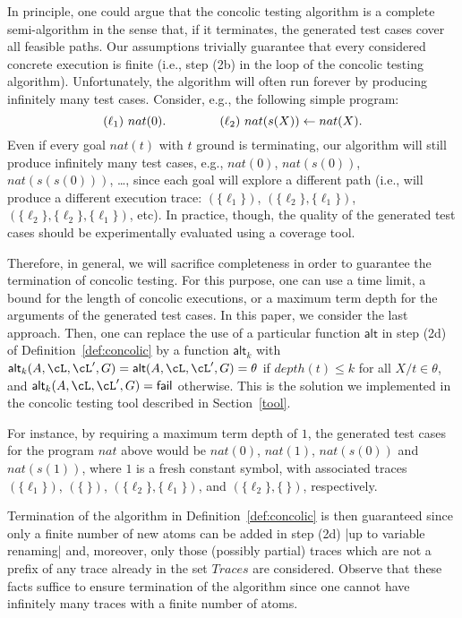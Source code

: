 \documentclass[fleqn]{tlp}
\newcommand{\alt}{\mathsf{alt}}
\newcommand{\sleq}{\leqslant}
\newcommand{\fail}{\mathsf{fail}}
\begin{document}
In principle, one could argue that the concolic testing algorithm is
a complete semi-algorithm in the sense that, if it terminates, the
generated test cases cover all feasible paths. Our assumptions
trivially guarantee that every considered concrete execution is finite
(i.e., step (2b) in the loop of the concolic testing
algorithm). Unfortunately, the algorithm will often run forever by
producing infinitely many test cases. Consider, e.g., the following
simple program:
\[
(\ell_1) ~nat(0).\hspace{10ex} (\ell_2)~nat(s(X)) \leftarrow nat(X).
\]
Even if every goal $nat(t)$ with $t$ ground is terminating, our
algorithm will still produce infinitely many test cases, e.g.,
$nat(0)$, $nat(s(0))$, $nat(s(s(0)))$, \ldots, since each goal will
explore a different path (i.e., will produce a different execution
trace: $(\{\ell_1\})$, $(\{\ell_2\},\{\ell_1\})$,
$(\{\ell_2\},\{\ell_2\},\{\ell_1\})$, etc). In practice, though, the
quality of the generated test cases should be experimentally evaluated
using a coverage tool.

Therefore, in general, we will sacrifice completeness in order to
guarantee the termination of concolic testing. For this purpose, one
can use a time limit, a bound for the length of concolic executions,
or a maximum term depth for the arguments of the generated test
cases. In this paper, we consider the last approach.
Then, one can replace the use of a particular function $\alt$ in step
(2d) of Definition~\ref{def:concolic} by a function $\alt_k$ with
$\alt_k(A,\cL,\cL',G)=\alt(A,\cL,\cL',G)=\theta$ if $depth(t)\sleq k$
for all $X/t\in\theta$, and $\alt_k(A,\cL,\cL',G) =\fail$ otherwise.
This is the solution we implemented in the concolic testing tool
described in Section~\ref{tool}.

For instance, by requiring a maximum term depth of $1$, the
generated test cases for the program $nat$ above would be $nat(0)$,
$nat(1)$, $nat(s(0))$ and $nat(s(1))$, where $1$ is a fresh constant
symbol, with associated traces $(\{\ell_1\})$, $(\{\:\})$,
$(\{\ell_2\},\{\ell_1\})$, and $(\{\ell_2\},\{\:\})$, respectively.

Termination of the algorithm in Definition~\ref{def:concolic} is then
guaranteed since only a finite number of new atoms can be added in
step (2d) |up to variable renaming| and, moreover, only those (possibly
partial) traces which are not a prefix of any trace already in the set
$\mathit{Traces}$ are considered. Observe that these facts suffice to
ensure termination of the algorithm since one cannot have infinitely
many traces with a finite number of atoms.
\end{document}
